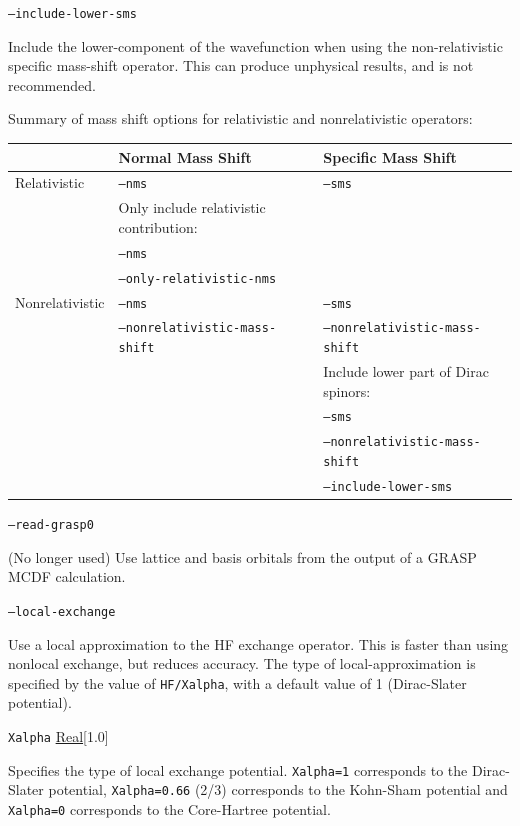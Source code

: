 \documentclass{report}
\begin{document}
\texttt{--include-lower-sms}
\begin{adjustwidth}{1cm}{}
Include the lower-component of the wavefunction when using the non-relativistic specific mass-shift operator.
This can produce unphysical results, and is not recommended.
\end{adjustwidth}

Summary of mass shift options for relativistic and nonrelativistic operators:
\begin{adjustwidth}{1cm}{}
\begin{tabular}{|l|l|l|}
\cline{2-3}
\multicolumn{1}{c|}{} & Normal Mass Shift & Specific Mass Shift \\
\hline
Relativistic & \texttt{--nms} & \texttt{--sms} \\
\cline{2-2}
 & Only include relativistic contribution: & \\
 & \texttt{--nms} & \\
 & \texttt{--only-relativistic-nms} & \\
\hline
Nonrelativistic & \texttt{--nms} & \texttt{--sms} \\
 & \texttt{--nonrelativistic-mass-shift} & \texttt{--nonrelativistic-mass-shift} \\
\cline{3-3}
 & & Include lower part of Dirac spinors: \\
 & & \texttt{--sms} \\
 & & \texttt{--nonrelativistic-mass-shift} \\
 & & \texttt{--include-lower-sms} \\
\hline
\end{tabular}
\end{adjustwidth}

\texttt{--read-grasp0}
\begin{adjustwidth}{1cm}{}
(No longer used) Use lattice and basis orbitals from the output of a GRASP MCDF calculation.
\end{adjustwidth}

\texttt{--local-exchange}
\begin{adjustwidth}{1cm}{}
Use a local approximation to the HF exchange operator. This is faster than using nonlocal exchange, but
reduces accuracy. The type of local-approximation is specified by the value of \texttt{HF/Xalpha}, with
a default value of 1 (Dirac-Slater potential).
\end{adjustwidth}

\texttt{Xalpha} \uline{Real}[1.0]
\begin{adjustwidth}{1cm}{}
Specifies the type of local exchange potential. \texttt{Xalpha=1} corresponds to the Dirac-Slater
potential, \texttt{Xalpha=0.66} (2/3) corresponds to the Kohn-Sham potential and \texttt{Xalpha=0}
corresponds to the Core-Hartree potential.
\end{adjustwidth}
\end{document}
